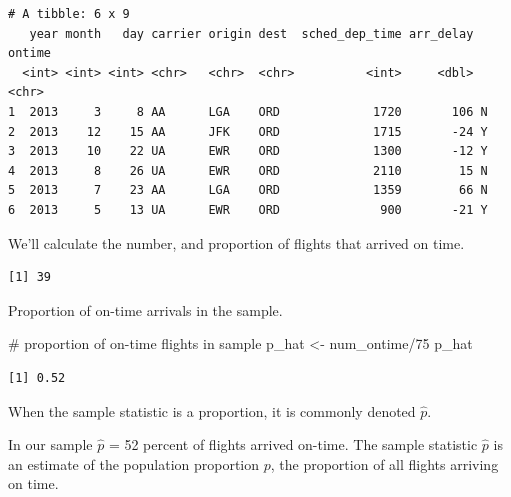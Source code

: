 \documentclass[
  letterpaper,
  DIV=11,
  numbers=noendperiod]{scrreprt}
\newenvironment{Shaded}{\begin{snugshade}}{\end{snugshade}}
\newcommand{\CommentTok}[1]{\textcolor[rgb]{0.37,0.37,0.37}{#1}}
\newcommand{\DecValTok}[1]{\textcolor[rgb]{0.68,0.00,0.00}{#1}}
\newcommand{\FunctionTok}[1]{\textcolor[rgb]{0.28,0.35,0.67}{#1}}
\newcommand{\NormalTok}[1]{\textcolor[rgb]{0.00,0.23,0.31}{#1}}
\newcommand{\OtherTok}[1]{\textcolor[rgb]{0.00,0.23,0.31}{#1}}
\newcommand{\SpecialCharTok}[1]{\textcolor[rgb]{0.37,0.37,0.37}{#1}}
\newcommand{\StringTok}[1]{\textcolor[rgb]{0.13,0.47,0.30}{#1}}
\begin{document}
\begin{verbatim}
# A tibble: 6 x 9
   year month   day carrier origin dest  sched_dep_time arr_delay ontime
  <int> <int> <int> <chr>   <chr>  <chr>          <int>     <dbl> <chr> 
1  2013     3     8 AA      LGA    ORD             1720       106 N     
2  2013    12    15 AA      JFK    ORD             1715       -24 Y     
3  2013    10    22 UA      EWR    ORD             1300       -12 Y     
4  2013     8    26 UA      EWR    ORD             2110        15 N     
5  2013     7    23 AA      LGA    ORD             1359        66 N     
6  2013     5    13 UA      EWR    ORD              900       -21 Y     
\end{verbatim}

We'll calculate the number, and proportion of flights that arrived on
time.

\begin{Shaded}
\end{Shaded}

\begin{verbatim}
[1] 39
\end{verbatim}

Proportion of on-time arrivals in the sample.

\begin{Shaded}
\begin{Highlighting}[]
\CommentTok{\# proportion of on{-}time flights in sample}
\NormalTok{p\_hat }\OtherTok{\textless{}{-}}\NormalTok{ num\_ontime}\SpecialCharTok{/}\DecValTok{75}
\NormalTok{p\_hat}
\end{Highlighting}
\end{Shaded}

\begin{verbatim}
[1] 0.52
\end{verbatim}

When the sample statistic is a proportion, it is commonly denoted
\(\hat{p}\).

In our sample \(\hat{p}\) = 52 percent of flights arrived on-time. The
sample statistic \(\hat{p}\) is an estimate of the population proportion
\(p\), the proportion of all flights arriving on time.
\end{document}
